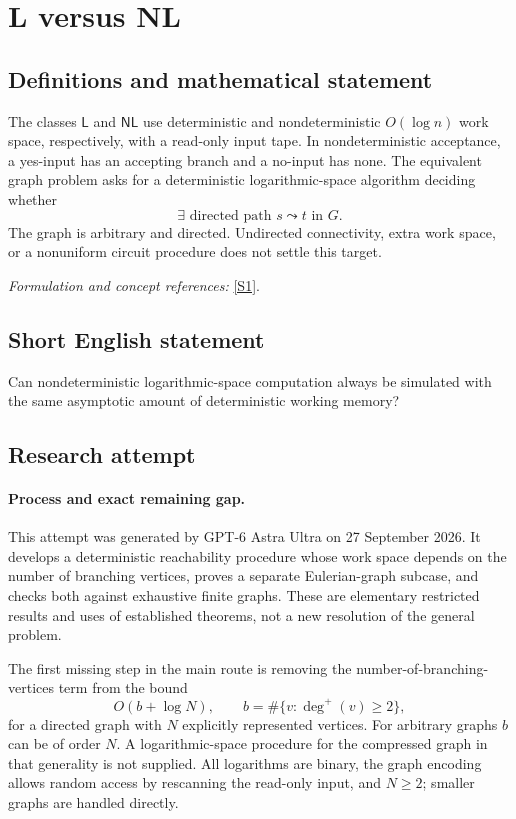 \documentclass[11pt]{article}
\begin{document}
\section*{\texorpdfstring{L versus NL}{L versus NL}}\label{30006727}
\subsection{Definitions and mathematical statement}
The classes $\mathsf L$ and $\mathsf{NL}$ use deterministic and nondeterministic $O(\log n)$ work space, respectively, with a read-only input tape. In nondeterministic acceptance, a yes-input has an accepting branch and a no-input has none. The equivalent graph problem asks for a deterministic logarithmic-space algorithm deciding whether
\[
 \exists\text{ directed path }s\leadsto t\text{ in }G.
\]
The graph is arbitrary and directed. Undirected connectivity, extra work space, or a nonuniform circuit procedure does not settle this target.
\par\smallskip\textit{Formulation and concept references:} \href{https://drops.dagstuhl.de/storage/00lipics/lipics-vol099-socg2018/LIPIcs.SoCG.2018/LIPIcs.SoCG.2018.pdf}{[S1]}.

\subsection{Short English statement}
Can nondeterministic logarithmic-space computation always be simulated with the same asymptotic amount of deterministic working memory?
\subsection{Research attempt}
\paragraph{Process and exact remaining gap.}
This attempt was generated by GPT-6 Astra Ultra on 27 September 2026. It develops a deterministic reachability procedure whose work space depends on the number of branching vertices, proves a separate Eulerian-graph subcase, and checks both against exhaustive finite graphs. These are elementary restricted results and uses of established theorems, not a new resolution of the general problem.

The first missing step in the main route is removing the number-of-branching-vertices term from the bound
\[
 O(b+\log N),\qquad
 b=\#\{v:\deg^+(v)\ge2\},
 \tag{99.1}
\]
for a directed graph with $N$ explicitly represented vertices. For arbitrary graphs $b$ can be of order $N$. A logarithmic-space procedure for the compressed graph in that generality is not supplied. All logarithms are binary, the graph encoding allows random access by rescanning the read-only input, and $N\ge2$; smaller graphs are handled directly.
\end{document}
